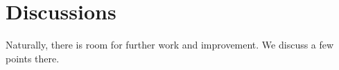 \section{Discussions}
Naturally, there is room for further work and improvement. We discuss a few points there.

 

